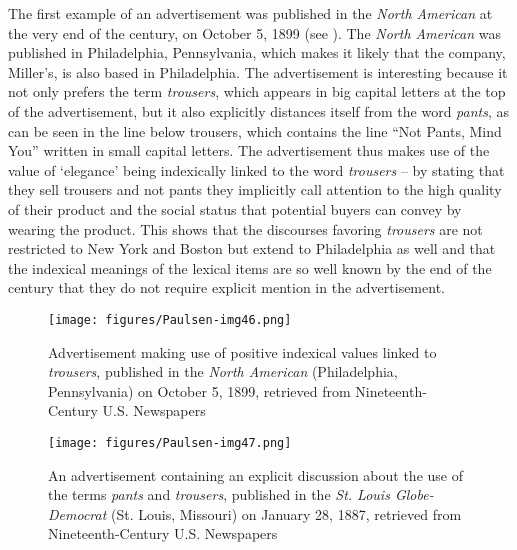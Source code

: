 The first example of an advertisement was published in the \emph{North American} at the very end of the century, on October 5, 1899 (see ). The \emph{North American} was published in Philadelphia, Pennsylvania, which makes it likely that the company, Miller’s, is also based in Philadelphia. The advertisement is interesting because it not only prefers the term \emph{trousers}, which appears in big capital letters at the top of the advertisement, but it also explicitly distances itself from the word \emph{pants}, as can be seen in the line below trousers, which contains the line “Not Pants, Mind You” written in small capital letters. The advertisement thus makes use of the value of ‘elegance’ being indexically linked to the word \emph{trousers} – by stating that they sell trousers and not pants they implicitly call attention to the high quality of their product and the social status that potential buyers can convey by wearing the product. This shows that the discourses favoring \emph{trousers} are not restricted to New York and Boston but extend to Philadelphia as well and that the indexical meanings of the lexical items are so well known by the end of the century that they do not require explicit mention in the advertisement.


\begin{figure}[b]
\texttt{[image: figures/Paulsen-img46.png]}
\caption{
Advertisement making use of positive indexical values linked to \emph{trousers}, published in the \emph{North American} (Philadelphia, Pennsylvania) on October 5, 1899, retrieved from Nineteenth-Century U.S. Newspapers
}
\label{fig:key:46}
\end{figure}

\begin{figure}[b]
\texttt{[image: figures/Paulsen-img47.png]}
\caption{
An advertisement containing an explicit discussion about the use of the terms \emph{pants} and \emph{trousers}, published in the \emph{St. Louis Globe-Democrat} (St. Louis, Missouri) on January 28, 1887, retrieved from Nineteenth-Century U.S. Newspapers
}
\label{fig:key:47}
\end{figure}


